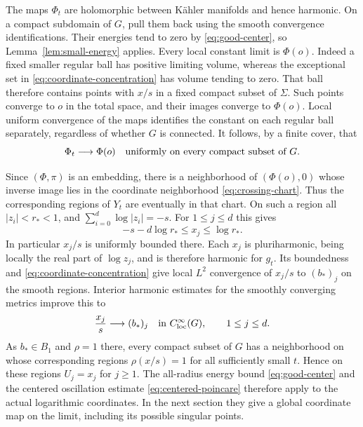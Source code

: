 The maps $\Phi_t$ are holomorphic between K\"ahler manifolds and hence
harmonic.  On a compact subdomain of $G$, pull them back using the
smooth convergence identifications.  Their energies tend to zero by
\eqref{eq:good-center}, so Lemma~\ref{lem:small-energy} applies.
Every local constant limit is $\Phi(o)$.  Indeed a fixed smaller regular
ball has positive limiting volume, whereas the exceptional set in
\eqref{eq:coordinate-concentration} has volume tending to zero.
That ball therefore contains points with $x/s$ in a fixed compact
subset of $\Sigma$.  Such points converge to $o$ in the total space,
and their images converge to $\Phi(o)$.  Local uniform convergence of
the maps identifies the constant on each regular ball separately,
regardless of whether $G$ is connected.
It follows, by a finite cover, that
\begin{equation}
 \Phi_t\longrightarrow\Phi(o)
       \quad\hbox{uniformly on every compact subset of }G.
 \label{eq:embedding-map-limit}
\end{equation}

Since $(\Phi,\pi)$ is an embedding, there is a neighborhood of
$(\Phi(o),0)$ whose inverse image lies in the coordinate neighborhood
\eqref{eq:crossing-chart}.  Thus the corresponding regions of $Y_t$
are eventually in that chart.  On such a region all $|z_i|<r_*<1$, and
$\sum_{i=0}^d\log|z_i|=-s$.  For $1\le j\le d$ this gives
\[
 -s-d\log r_*\le x_j\le\log r_*.
\]
In particular $x_j/s$ is uniformly bounded there.  Each $x_j$ is
pluriharmonic, being locally the real part of $\log z_j$, and is
therefore harmonic for $g_t$.  Its boundedness and
\eqref{eq:coordinate-concentration} give local $L^2$ convergence of
$x_j/s$ to $(b_*)_j$ on the smooth regions.  Interior harmonic estimates
for the smoothly converging metrics improve this to
\begin{equation}
 \frac{x_j}{s}\longrightarrow(b_*)_j
       \quad\hbox{in }C^\infty_{\rm loc}(G),\qquad 1\le j\le d.
 \label{eq:regular-chart-convergence}
\end{equation}
As $b_*\in B_1$ and $\rho=1$ there, every compact subset of $G$ has a
neighborhood on whose corresponding regions $\rho(x/s)=1$ for all
sufficiently small $t$.  Hence on these regions $U_j=x_j$ for $j\ge1$.
The all-radius energy bound \eqref{eq:good-center} and the centered
oscillation estimate \eqref{eq:centered-poincare} therefore apply to
the actual logarithmic coordinates.  In the next section they give a
global coordinate map on the limit, including its possible singular
points.
